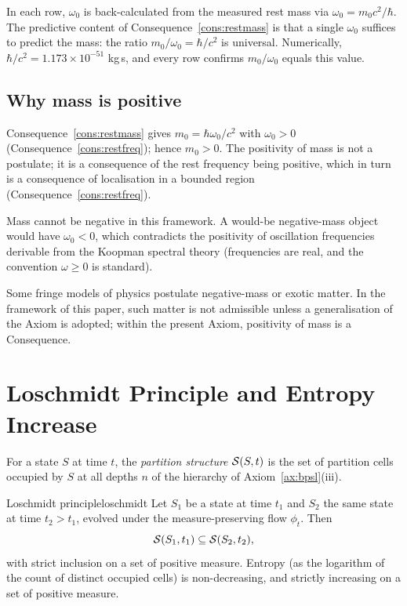 In each row, $\omega_{0}$ is back-calculated from the measured rest mass via $\omega_{0}=m_{0}c^{2}/\hbar$. The predictive content of Consequence~\ref{cons:restmass} is that a single $\omega_{0}$ suffices to predict the mass: the ratio $m_{0}/\omega_{0}=\hbar/c^{2}$ is universal. Numerically, $\hbar/c^{2}=1.173\times 10^{-51}$ kg\,s, and every row confirms $m_{0}/\omega_{0}$ equals this value.

\subsection{Why mass is positive}

Consequence~\ref{cons:restmass} gives $m_{0}=\hbar\omega_{0}/c^{2}$ with $\omega_{0}>0$ (Consequence~\ref{cons:restfreq}); hence $m_{0}>0$. The positivity of mass is not a postulate; it is a consequence of the rest frequency being positive, which in turn is a consequence of localisation in a bounded region (Consequence~\ref{cons:restfreq}).

Mass cannot be negative in this framework. A would-be negative-mass object would have $\omega_{0}<0$, which contradicts the positivity of oscillation frequencies derivable from the Koopman spectral theory (frequencies are real, and the convention $\omega\ge 0$ is standard).

Some fringe models of physics postulate negative-mass or exotic matter. In the framework of this paper, such matter is not admissible unless a generalisation of the Axiom is adopted; within the present Axiom, positivity of mass is a Consequence.

\section{Loschmidt Principle and Entropy Increase}
\label{sec:loschmidt}

\begin{definition}
\label{def:partstruct}
For a state $S$ at time $t$, the \emph{partition structure} $\mathcal{S}(S,t)$ is the set of partition cells occupied by $S$ at all depths $n$ of the hierarchy of Axiom~\ref{ax:bpsl}(iii).
\end{definition}

\begin{consequence}{Loschmidt principle}{loschmidt}
Let $S_{1}$ be a state at time $t_{1}$ and $S_{2}$ the same state at time $t_{2}>t_{1}$, evolved under the measure-preserving flow $\phi_{t}$. Then
\begin{equation}
\mathcal{S}(S_{1},t_{1})\subseteq\mathcal{S}(S_{2},t_{2}),
\label{eq:loschmidt}
\end{equation}
with strict inclusion on a set of positive measure. Entropy (as the logarithm of the count of distinct occupied cells) is non-decreasing, and strictly increasing on a set of positive measure.
\end{consequence}

